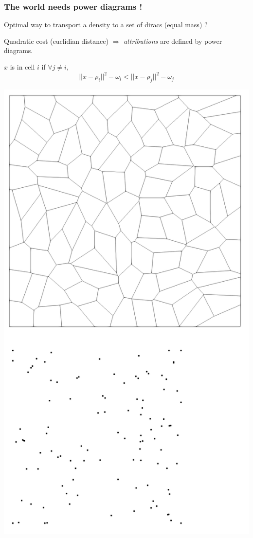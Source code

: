 \documentclass[aspectratio=169]{beamer}
\begin{document}
\begin{frame}
    \frametitle{The world needs power diagrams !}

    \begin{minipage}[c][0.6\textheight][c]{0.5\textwidth}
        Optimal way to transport a density to a set of diracs (equal mass) ? 
        
        \vfill
        Quadratic cost (euclidian distance) $\Rightarrow$ \textit{attributions} are defined by power diagrams.
        
        \vfill
        $x$ is in cell $i$ if $\forall j \neq i$,
         $$|| x - \rho_i ||^2 - \omega_i < || x - \rho_j ||^2 - \omega_j $$
    \end{minipage}
    \kern 0.5cm
    \begin{minipage}{0.45\textwidth}
        \begin{center}
            \includegraphics[height=0.8\textheight]{img/pd.png}
        \end{center}
    \end{minipage}
\end{frame}
\end{document}
